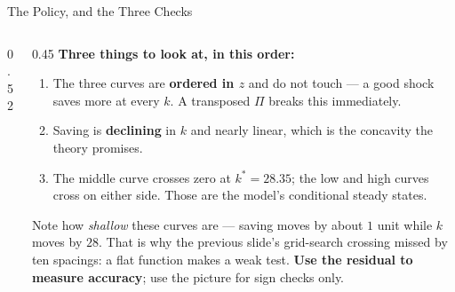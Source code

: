 \begin{frame}{The Policy, and the Three Checks}
\begin{columns}[c]
\begin{column}{0.52\textwidth}
\end{column}
\begin{column}{0.45\textwidth}
\small
\textbf{Three things to look at, in this order:}
\medskip
\begin{enumerate}\footnotesize
  \item The three curves are \textbf{ordered in $z$} and do not touch --- a good shock saves more at every $k$. A transposed $\Pi$ breaks this immediately.
  \item Saving is \textbf{declining} in $k$ and nearly linear, which is the concavity the theory promises.
  \item The middle curve crosses zero at $k^{*}=28.35$; the low and high curves cross on either side. Those are the model's conditional steady states.
\end{enumerate}
\medskip
\begin{cautionbox}\footnotesize
Note how \emph{shallow} these curves are --- saving moves by about $1$ unit while $k$ moves by $28$. That is why the previous slide's grid-search crossing missed by ten spacings: a flat function makes a weak test. \textbf{Use the residual to measure accuracy}; use the picture for sign checks only.
\end{cautionbox}
\end{column}
\end{columns}
\end{frame}

